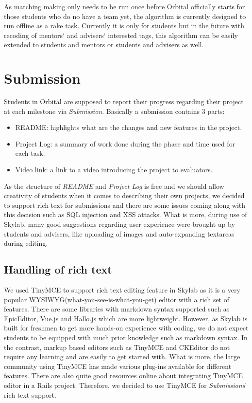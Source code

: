 As matching making only needs to be run once before Orbital officially starts for those students who do no have a team yet, the algorithm is currently designed to run offline as a rake task. Currently it is only for students but in the future with recoding of mentors` and advisers` interested tags, this algorithm can be easily extended to students and mentors or students and advisers as well.

\section{Submission} \label{submission}

Students in Orbital are supposed to report their progress regarding their project at each milestone via \textit{Submission}. Basically a submission contains 3 parts:

\begin{itemize}
  \item README: highlights what are the changes and new features in the project.
  \item Project Log: a summary of work done during the phase and time used for each task.
  \item Video link: a link to a video introducing the project to evaluators.
\end{itemize}

As the structure of \textit{README} and \textit{Project Log} is free and we should allow creativity of students when it comes to describing their own projects, we decided to support rich text for submissions and there are some issues coming along with this decision such as SQL injection and XSS attacks. What is more, during use of Skylab, many good suggestions regarding user experience were brought up by students and advisers, like uploading of images and auto-expanding textareas during editing.

\subsection{Handling of rich text}

We used TinyMCE to support rich text editing feature in Skylab as it is a very popular WYSIWYG(what-you-see-is-what-you-get) editor with a rich set of features\cite{citationtinymce}. There are some libraries with markdown syntax supported such as EpicEditor, Vue.js and Hallo.js which are more lightweight. However, as Skylab is built for freshmen to get more hands-on experience with coding, we do not expect students to be equipped with much prior knowledge such as markdown syntax. In the contrast, markup based editors such as TinyMCE and CKEditor do not require any learning and are easily to get started with. What is more, the large community using TinyMCE has made various plug-ins available for different features. There are also quite good resources online about integrating TinyMCE editor in a Rails project. Therefore, we decided to use TinyMCE for \textit{Submissions}' rich text support.

